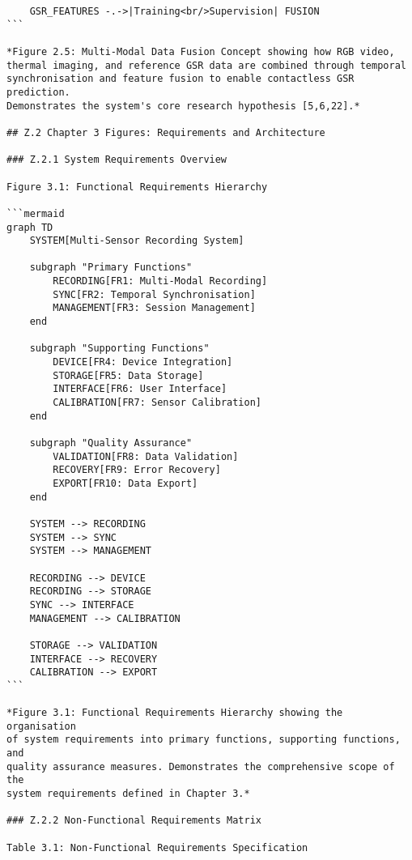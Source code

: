 \begin{verbatim}
    GSR_FEATURES -.->|Training<br/>Supervision| FUSION
```

*Figure 2.5: Multi-Modal Data Fusion Concept showing how RGB video,
thermal imaging, and reference GSR data are combined through temporal
synchronisation and feature fusion to enable contactless GSR prediction.
Demonstrates the system's core research hypothesis [5,6,22].*

## Z.2 Chapter 3 Figures: Requirements and Architecture

### Z.2.1 System Requirements Overview

Figure 3.1: Functional Requirements Hierarchy

```mermaid
graph TD
    SYSTEM[Multi-Sensor Recording System]

    subgraph "Primary Functions"
        RECORDING[FR1: Multi-Modal Recording]
        SYNC[FR2: Temporal Synchronisation]
        MANAGEMENT[FR3: Session Management]
    end

    subgraph "Supporting Functions"
        DEVICE[FR4: Device Integration]
        STORAGE[FR5: Data Storage]
        INTERFACE[FR6: User Interface]
        CALIBRATION[FR7: Sensor Calibration]
    end

    subgraph "Quality Assurance"
        VALIDATION[FR8: Data Validation]
        RECOVERY[FR9: Error Recovery]
        EXPORT[FR10: Data Export]
    end

    SYSTEM --> RECORDING
    SYSTEM --> SYNC
    SYSTEM --> MANAGEMENT

    RECORDING --> DEVICE
    RECORDING --> STORAGE
    SYNC --> INTERFACE
    MANAGEMENT --> CALIBRATION

    STORAGE --> VALIDATION
    INTERFACE --> RECOVERY
    CALIBRATION --> EXPORT
```

*Figure 3.1: Functional Requirements Hierarchy showing the organisation
of system requirements into primary functions, supporting functions, and
quality assurance measures. Demonstrates the comprehensive scope of the
system requirements defined in Chapter 3.*

### Z.2.2 Non-Functional Requirements Matrix

Table 3.1: Non-Functional Requirements Specification


\end{verbatim}
